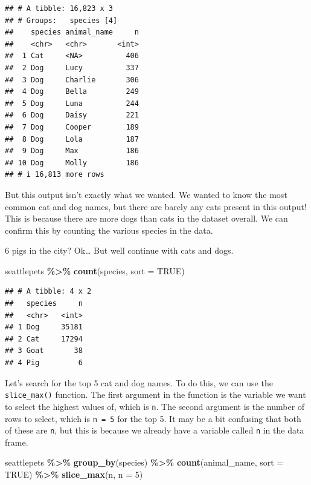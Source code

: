 \documentclass[
]{article}
\newenvironment{Shaded}{\begin{snugshade}}{\end{snugshade}}
\newcommand{\AttributeTok}[1]{\textcolor[rgb]{0.13,0.29,0.53}{#1}}
\newcommand{\ConstantTok}[1]{\textcolor[rgb]{0.56,0.35,0.01}{#1}}
\newcommand{\DecValTok}[1]{\textcolor[rgb]{0.00,0.00,0.81}{#1}}
\newcommand{\FunctionTok}[1]{\textcolor[rgb]{0.13,0.29,0.53}{\textbf{#1}}}
\newcommand{\NormalTok}[1]{#1}
\newcommand{\SpecialCharTok}[1]{\textcolor[rgb]{0.81,0.36,0.00}{\textbf{#1}}}
\begin{document}
\begin{verbatim}
## # A tibble: 16,823 x 3
## # Groups:   species [4]
##    species animal_name     n
##    <chr>   <chr>       <int>
##  1 Cat     <NA>          406
##  2 Dog     Lucy          337
##  3 Dog     Charlie       306
##  4 Dog     Bella         249
##  5 Dog     Luna          244
##  6 Dog     Daisy         221
##  7 Dog     Cooper        189
##  8 Dog     Lola          187
##  9 Dog     Max           186
## 10 Dog     Molly         186
## # i 16,813 more rows
\end{verbatim}

But this output isn't exactly what we wanted. We wanted to know the most
common cat and dog names, but there are barely any cats present in this
output! This is because there are more dogs than cats in the dataset
overall. We can confirm this by counting the various species in the
data.

\begin{Shaded}
\begin{Highlighting}[]
\NormalTok{6 pigs in the city? Ok… But we\textquotesingle{}ll continue with cats and dogs.}
\end{Highlighting}
\end{Shaded}

\begin{Shaded}
\begin{Highlighting}[]
\NormalTok{seattlepets }\SpecialCharTok{\%\textgreater{}\%}
  \FunctionTok{count}\NormalTok{(species, }\AttributeTok{sort =} \ConstantTok{TRUE}\NormalTok{)}
\end{Highlighting}
\end{Shaded}

\begin{verbatim}
## # A tibble: 4 x 2
##   species     n
##   <chr>   <int>
## 1 Dog     35181
## 2 Cat     17294
## 3 Goat       38
## 4 Pig         6
\end{verbatim}

Let's search for the top 5 cat and dog names. To do this, we can use the
\texttt{slice\_max()} function. The first argument in the function is
the variable we want to select the highest values of, which is
\texttt{n}. The second argument is the number of rows to select, which
is \texttt{n\ =\ 5} for the top 5. It may be a bit confusing that both
of these are \texttt{n}, but this is because we already have a variable
called \texttt{n} in the data frame.

\begin{Shaded}
\begin{Highlighting}[]
\NormalTok{seattlepets }\SpecialCharTok{\%\textgreater{}\%}
  \FunctionTok{group\_by}\NormalTok{(species) }\SpecialCharTok{\%\textgreater{}\%}
  \FunctionTok{count}\NormalTok{(animal\_name, }\AttributeTok{sort =} \ConstantTok{TRUE}\NormalTok{) }\SpecialCharTok{\%\textgreater{}\%}
  \FunctionTok{slice\_max}\NormalTok{(n, }\AttributeTok{n =} \DecValTok{5}\NormalTok{)}
\end{Highlighting}
\end{Shaded}
\end{document}
